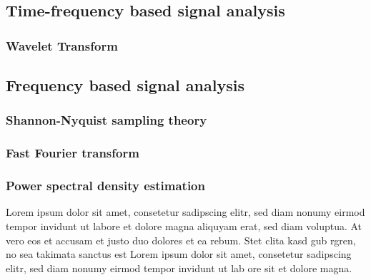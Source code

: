 \subsection{Time-frequency based signal analysis}
\subsubsection{Wavelet Transform}
\subsection{Frequency based signal analysis}
\subsubsection{Shannon-Nyquist sampling theory}
\subsubsection{Fast Fourier transform}
\subsubsection{Power spectral density estimation}

Lorem ipsum dolor sit amet, consetetur sadipscing elitr, sed diam nonumy eirmod tempor invidunt ut labore et dolore magna aliquyam erat, sed diam voluptua. At vero eos et accusam et justo duo dolores et ea rebum. Stet clita kasd gub rgren, no sea takimata sanctus est Lorem ipsum dolor sit amet, consetetur sadipscing elitr, sed diam nonumy eirmod tempor invidunt ut lab ore sit et dolore magna.

